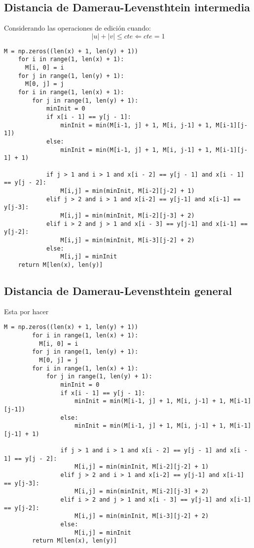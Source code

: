 \vfill
\subsection{Distancia de Damerau-Levensthtein intermedia}
Considerando las operaciones de edición cuando:
\begin{equation}
    |u| + |v| 	\leqslant cte \Leftarrow cte = 1
\end{equation}
\begin{lstlisting}[label={list:first},caption=Damerau-Levensthtein intermedio]
    M = np.zeros((len(x) + 1, len(y) + 1))
    for i in range(1, len(x) + 1):
      M[i, 0] = i
    for j in range(1, len(y) + 1):
      M[0, j] = j
    for i in range(1, len(x) + 1):
        for j in range(1, len(y) + 1):
            minInit = 0
            if x[i - 1] == y[j - 1]:
                minInit = min(M[i-1, j] + 1, M[i, j-1] + 1, M[i-1][j-1])
            else:
                minInit = min(M[i-1, j] + 1, M[i, j-1] + 1, M[i-1][j-1] + 1)

            if j > 1 and i > 1 and x[i - 2] == y[j - 1] and x[i - 1] == y[j - 2]:
                M[i,j] = min(minInit, M[i-2][j-2] + 1)
            elif j > 2 and i > 1 and x[i-2] == y[j-1] and x[i-1] == y[j-3]:
                M[i,j] = min(minInit, M[i-2][j-3] + 2)
            elif i > 2 and j > 1 and x[i - 3] == y[j-1] and x[i-1] == y[j-2]:
                M[i,j] = min(minInit, M[i-3][j-2] + 2)
            else:
                M[i,j] = minInit
    return M[len(x), len(y)]
\end{lstlisting}

\subsection{Distancia de Damerau-Levensthtein general}
    Esta por hacer
    \begin{lstlisting}[label={list:first},caption=Damerau-Levensthtein general]
        M = np.zeros((len(x) + 1, len(y) + 1))
        for i in range(1, len(x) + 1):
          M[i, 0] = i
        for j in range(1, len(y) + 1):
          M[0, j] = j
        for i in range(1, len(x) + 1):
            for j in range(1, len(y) + 1):
                minInit = 0
                if x[i - 1] == y[j - 1]:
                    minInit = min(M[i-1, j] + 1, M[i, j-1] + 1, M[i-1][j-1])
                else:
                    minInit = min(M[i-1, j] + 1, M[i, j-1] + 1, M[i-1][j-1] + 1)
    
                if j > 1 and i > 1 and x[i - 2] == y[j - 1] and x[i - 1] == y[j - 2]:
                    M[i,j] = min(minInit, M[i-2][j-2] + 1)
                elif j > 2 and i > 1 and x[i-2] == y[j-1] and x[i-1] == y[j-3]:
                    M[i,j] = min(minInit, M[i-2][j-3] + 2)
                elif i > 2 and j > 1 and x[i - 3] == y[j-1] and x[i-1] == y[j-2]:
                    M[i,j] = min(minInit, M[i-3][j-2] + 2)
                else:
                    M[i,j] = minInit
        return M[len(x), len(y)]
\end{lstlisting}



\newpage